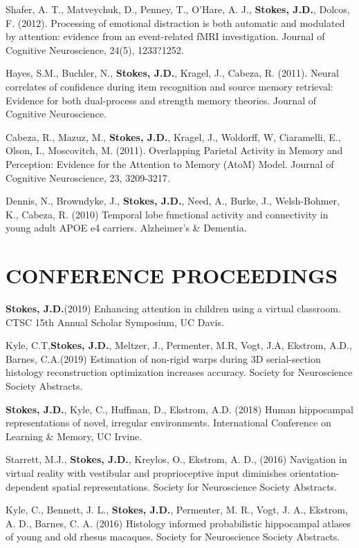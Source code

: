 \documentclass[line,margin,10pt]{res}
\begin{document}
\begin{resume}
Shafer, A. T., Matveychuk, D., Penney, T., O'Hare, A. J., \textbf{Stokes, J.D.}, Dolcos, F. (2012). Processing of emotional distraction is both automatic and modulated by attention: evidence from an event-related fMRI investigation. Journal of Cognitive Neuroscience, 24(5), 1233?1252.
 		
Hayes, S.M., Buchler, N., \textbf{Stokes, J.D.}, Kragel, J., Cabeza, R. (2011). Neural correlates of confidence during item recognition and source memory retrieval: Evidence for both dual-process and strength memory theories. Journal of Cognitive Neuroscience.
	
Cabeza, R., Mazuz, M., \textbf{Stokes, J.D.}, Kragel, J., Woldorff, W, Ciaramelli, E., Olson, I., Moscovitch, M. (2011). Overlapping Parietal Activity in Memory and Perception: Evidence for the Attention to Memory (AtoM) Model. Journal of Cognitive Neuroscience, 23, 3209-3217.
	
Dennis, N., Browndyke, J., \textbf{Stokes, J.D.}, Need, A., Burke, J., Welsh-Bohmer, K., Cabeza, R. (2010) Temporal lobe functional activity and connectivity in young adult APOE e4 carriers. Alzheimer's \& Dementia.

\section{CONFERENCE PROCEEDINGS} 
\textbf{Stokes, J.D.}(2019) Enhancing attention in children using a virtual classroom. CTSC 15th Annual Scholar Symposium, UC Davis.

Kyle, C.T,\textbf{Stokes, J.D.}, Meltzer, J., Permenter, M.R, Vogt, J.A, Ekstrom, A.D., Barnes, C.A.(2019) Estimation of non-rigid warps during 3D serial-section histology reconstruction optimization increases accuracy. Society for Neuroscience Society Abstracts.

\textbf{Stokes, J.D.}, Kyle, C., Huffman, D., Ekstrom, A.D. (2018) Human hippocampal representations of novel, irregular environments. International Conference on Learning \& Memory, UC Irvine.

Starrett, M.J., \textbf{Stokes, J.D.}, Kreylos, O., Ekstrom, A. D., (2016) Navigation in virtual reality with vestibular and proprioceptive input diminishes orientation-dependent spatial representations. Society for Neuroscience Society Abstracts.

Kyle, C., Bennett, J. L., \textbf{Stokes, J.D.}, Permenter, M. R., Vogt, J. A., Ekstrom, A. D., Barnes, C. A. (2016) Histology informed probabilistic hippocampal atlases of young and old rhesus macaques. Society for Neuroscience Society Abstracts.


\end{resume}
\end{document}

